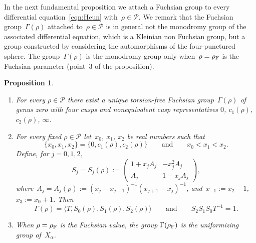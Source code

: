 \documentclass[pdftex]{sigma}
\numberwithin{equation}{section}
\newtheorem{Proposition}[Theorem]{Proposition}
 { \theoremstyle{definition}
\newtheorem{Definition}[Theorem]{Definition}
\newtheorem{Example}[Theorem]{Example}
\newtheorem{Remark}[Theorem]{Remark} }
\begin{document}
In the next fundamental proposition we attach a Fuchsian group to every differential equation~\eqref{eqn:Heun} with~$\rho\in\mathcal{P}$. We remark that the Fuchsian group~$\Gamma(\rho)$ attached to~$\rho\in\mathcal{P}$ is in general not the monodromy group of the associated differential equation, which is a Kleinian non Fuchsian group, but a group constructed by considering the automorphisms of the four-punctured sphere. The group~$\Gamma(\rho)$ is the monodromy group only when~$\rho=\rho_{\rm F}$ is the Fuchsian parameter (point~3 of the proposition).
\begin{Proposition}\label{thm:fund}\quad\samepage
\begin{enumerate}\itemsep=0pt
\item[$1.$] For every $\rho\in\mathcal{P}$ there exist a unique torsion-free Fuchsian group~$\Gamma(\rho)$ of genus zero with four cusps and nonequivalent cusp representatives $0$, $c_1(\rho)$, $c_2(\rho)$, $\infty$.
\item[$2.$] For every fixed $\rho\in\mathcal{P}$ let~$x_0$, $x_1$, $x_2$ be real numbers such that
\[\{x_0,x_1,x_2\}=\{0,c_1(\rho),c_2(\rho)\}\qquad\text{and}\qquad x_0<x_1<x_2.
\]
Define, for $j=0,1,2$,
\[
S_j=S_j(\rho):=\begin{pmatrix}
1+x_jA_j & -x_j^2A_j\\
A_j & 1-x_jA_j
\end{pmatrix},
\]
where~$A_j=A_j(\rho):= (x_j-x_{j-1} )^{-1} (x_{j+1}-x_j )^{-1}$, and~$x_{-1}:=x_2-1$, $x_3:=x_0+1$. Then
\[
\Gamma(\rho)=\langle T,S_0(\rho),S_1(\rho),S_2(\rho)\rangle \qquad\text{and}\qquad S_2S_1S_0T^{-1}=1 .
\]
\item[$3.$] When $\rho=\rho_{\rm F}$ is the Fuchsian value, the group $\Gamma(\rho_{\rm F})$ is the uniformizing group of~$X_\alpha$.
\end{enumerate}
\end{Proposition}
\end{document}
